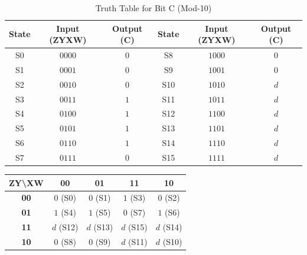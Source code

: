 \documentclass[journal,12pt,onecolumn]{IEEEtran}
\begin{document}
		\begin{table}[H]
			\centering
			\begin{tabular}{|c|c|c||c|c|c|}
				\hline
				\textbf{State} & \textbf{Input (ZYXW)} & \textbf{Output (C)} & \textbf{State} & \textbf{Input (ZYXW)} & \textbf{Output (C)} \\
				\hline
				S0 & $0000$ & $0$ & S8 & $1000$ & $0$ \\
				\hline
				S1 & $0001$ & $0$ & S9 & $1001$ & $0$ \\
				\hline
				S2 & $0010$ & $0$ & S10 & $1010$ & $d$ \\
				\hline
				S3 & $0011$ & $1$ & S11 & $1011$ & $d$ \\
				\hline
				S4 & $0100$ & $1$ & S12 & $1100$ & $d$ \\
				\hline
				S5 & $0101$ & $1$ & S13 & $1101$ & $d$ \\
				\hline
				S6 & $0110$ & $1$ & S14 & $1110$ & $d$ \\
				\hline
				S7 & $0111$ & $0$ & S15 & $1111$ & $d$ \\
				\hline
			\end{tabular}
			\caption{Truth Table for Bit C (Mod-10)}
		\end{table}
		
		\begin{table}[H]
			\centering
			\begin{tabular}{|c|c|c|c|c|}
				\hline
				\textbf{ZY\textbackslash XW} & \textbf{00} & \textbf{01} & \textbf{11} & \textbf{10} \\
				\hline
				\textbf{00} & $0$ (S0) & $0$ (S1) & \cellcolor{grpGreen}$1$ (S3) & $0$ (S2) \\
				\hline
				\textbf{01} & \cellcolor{grpYellow}$1$ (S4) & \cellcolor{grpRed}$1$ (S5) & $0$ (S7) & \cellcolor{grpYellow}$1$ (S6) \\
				\hline
				\textbf{11} & \cellcolor{grpYellow}$d$ (S12) & \cellcolor{grpRed}$d$ (S13) & $d$ (S15) & \cellcolor{grpYellow}$d$ (S14) \\
				\hline
				\textbf{10} & $0$ (S8) & $0$ (S9) & $d$ (S11) & $d$ (S10) \\
				\hline
			\end{tabular}
		\end{table}
		
\end{document}
